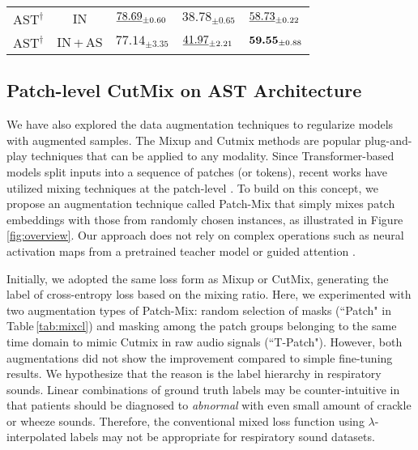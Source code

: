 \documentclass{INTERSPEECH2023}
\begin{document}
\begin{table}[!t]
{\begin{tabular}{lclll}
    $\text{AST}^\dagger$ & IN & $\text{\underline{78.69}}_{\pm 0.60}$ & $\text{38.78}_{\pm 0.65}$ & $\text{\underline{58.73}}_{\pm 0.22}$ \\
    \rowcolor[gray]{0.85}
    $\text{AST}^\dagger$ & \!IN\,+\,AS\! & $\text{77.14}_{\pm 3.35}$ & $\text{\underline{41.97}}_{\pm 2.21}$ & $\text{\bf 59.55}_{\pm 0.88}$ \\
\bottomrule
    \end{tabular}
    }
    \vspace{-6.5pt}
\end{table}  \subsection{Patch-level CutMix on AST Architecture}
\vspace{-2pt}


We have also explored the data augmentation techniques to regularize models with augmented samples.
The Mixup \cite{zhang2017mixup} and Cutmix \cite{yun2019cutmix} methods are popular plug-and-play techniques that can be applied to any modality. Since Transformer-based models split inputs into a sequence of patches (or tokens), recent works have utilized mixing techniques at the patch-level \cite{liu2022tokenmix, choi2022tokenmixup}. To build on this concept, we propose an augmentation technique called Patch-Mix that simply mixes patch embeddings with those from randomly chosen instances, as illustrated in Figure\,\ref{fig:overview}. Our approach does not rely on complex operations such as neural activation maps from a pretrained teacher model \cite{liu2022tokenmix} or guided attention \cite{choi2022tokenmixup}.

Initially, we adopted the same loss form as Mixup or CutMix, generating the label of cross-entropy loss based on the mixing ratio.
Here, we experimented with two augmentation types of Patch-Mix: random selection of masks (``Patch" in Table\,\ref{tab:mixcl}) and masking among the patch groups belonging to the same time domain to mimic Cutmix in raw audio signals (``T-Patch"). 
However, both augmentations did not show the improvement compared to simple fine-tuning results. We hypothesize that the reason is the label hierarchy in respiratory sounds. Linear combinations of ground truth labels may be counter-intuitive in that patients should be diagnosed to \textit{abnormal} with even small amount of crackle or wheeze sounds. Therefore, the conventional mixed loss function using $\lambda$-interpolated labels may not be appropriate for respiratory sound datasets.
\vspace{-3pt}
\end{document}
